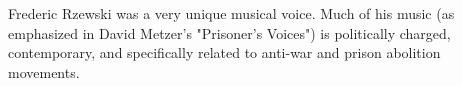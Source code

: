 \clearpage



\begin{adjustwidth}{2.5ex}{0pt}

  Frederic Rzewski was a very unique musical voice. Much of his music 
  (as emphasized in David Metzer's "Prisoner's Voices") is politically 
  charged, contemporary, and specifically related to anti-war and 
  prison abolition movements.

\end{adjustwidth}

